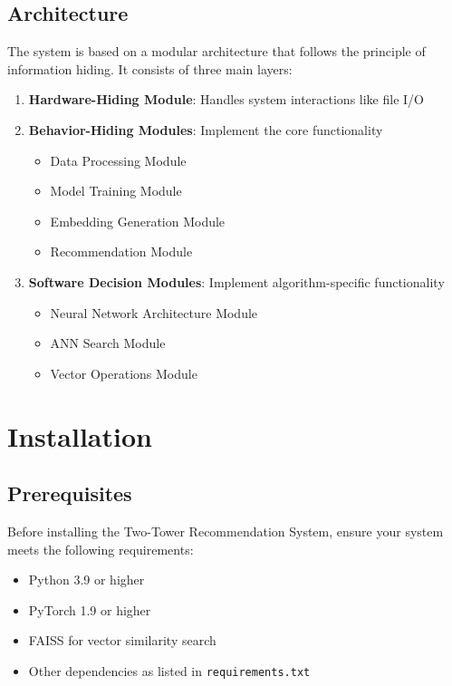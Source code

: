 \documentclass[12pt, a4paper, oneside]{book}
\begin{document}
\section{Architecture}
The system is based on a modular architecture that follows the principle of information hiding. It consists of three main layers:

\begin{enumerate}
    \item \textbf{Hardware-Hiding Module}: Handles system interactions like file I/O
    \item \textbf{Behavior-Hiding Modules}: Implement the core functionality
        \begin{itemize}
            \item Data Processing Module
            \item Model Training Module
            \item Embedding Generation Module
            \item Recommendation Module
        \end{itemize}
    \item \textbf{Software Decision Modules}: Implement algorithm-specific functionality
        \begin{itemize}
            \item Neural Network Architecture Module
            \item ANN Search Module
            \item Vector Operations Module
        \end{itemize}
\end{enumerate}


\chapter{Installation}

\section{Prerequisites}
Before installing the Two-Tower Recommendation System, ensure your system meets the following requirements:

\begin{itemize}
    \item Python 3.9 or higher
    \item PyTorch 1.9 or higher
    \item FAISS for vector similarity search
    \item Other dependencies as listed in \texttt{requirements.txt}
\end{itemize}
\end{document}
